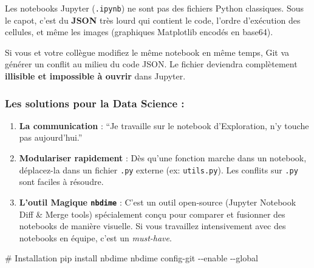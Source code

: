 \documentclass[
  letterpaper,
  DIV=11,
  numbers=noendperiod]{scrreprt}
\newenvironment{Shaded}{\begin{snugshade}}{\end{snugshade}}
\newcommand{\AttributeTok}[1]{\textcolor[rgb]{0.40,0.45,0.13}{#1}}
\newcommand{\CommentTok}[1]{\textcolor[rgb]{0.37,0.37,0.37}{#1}}
\newcommand{\ExtensionTok}[1]{\textcolor[rgb]{0.00,0.23,0.31}{#1}}
\newcommand{\NormalTok}[1]{\textcolor[rgb]{0.00,0.23,0.31}{#1}}
\providecommand{\tightlist}{%
  \setlength{\itemsep}{0pt}\setlength{\parskip}{0pt}}
\begin{document}
\begin{tcolorbox}[enhanced jigsaw, arc=.35mm, bottomrule=.15mm, bottomtitle=1mm, breakable, colback=white, colbacktitle=quarto-callout-warning-color!10!white, colframe=quarto-callout-warning-color-frame, coltitle=black, left=2mm, leftrule=.75mm, opacityback=0, opacitybacktitle=0.6, rightrule=.15mm, title=\textcolor{quarto-callout-warning-color}{\faExclamationTriangle}\hspace{0.5em}{Le piège du fichier \texttt{.ipynb}}, titlerule=0mm, toprule=.15mm, toptitle=1mm]

Les notebooks Jupyter (\texttt{.ipynb}) ne sont pas des fichiers Python
classiques. Sous le capot, c'est du \textbf{JSON} très lourd qui
contient le code, l'ordre d'exécution des cellules, et même les images
(graphiques Matplotlib encodés en base64).

\end{tcolorbox}

Si vous et votre collègue modifiez le même notebook en même temps, Git
va générer un conflit au milieu du code JSON. Le fichier deviendra
complètement \textbf{illisible et impossible à ouvrir} dans Jupyter.

\subsubsection{Les solutions pour la Data Science
:}\label{les-solutions-pour-la-data-science}

\begin{enumerate}
\def\labelenumi{\arabic{enumi}.}
\tightlist
\item
  \textbf{La communication} : ``Je travaille sur le notebook
  d'Exploration, n'y touche pas aujourd'hui.''
\item
  \textbf{Modulariser rapidement} : Dès qu'une fonction marche dans un
  notebook, déplacez-la dans un fichier \texttt{.py} externe (ex:
  \texttt{utils.py}). Les conflits sur \texttt{.py} sont faciles à
  résoudre.
\item
  \textbf{L'outil Magique \texttt{nbdime}} : C'est un outil open-source
  (Jupyter Notebook Diff \& Merge tools) spécialement conçu pour
  comparer et fusionner des notebooks de manière visuelle. Si vous
  travaillez intensivement avec des notebooks en équipe, c'est un
  \emph{must-have}.
\end{enumerate}

\begin{Shaded}
\begin{Highlighting}[]
\CommentTok{\# Installation}
\ExtensionTok{pip}\NormalTok{ install nbdime}
\ExtensionTok{nbdime}\NormalTok{ config{-}git }\AttributeTok{{-}{-}enable} \AttributeTok{{-}{-}global}
\end{Highlighting}
\end{Shaded}
\end{document}
